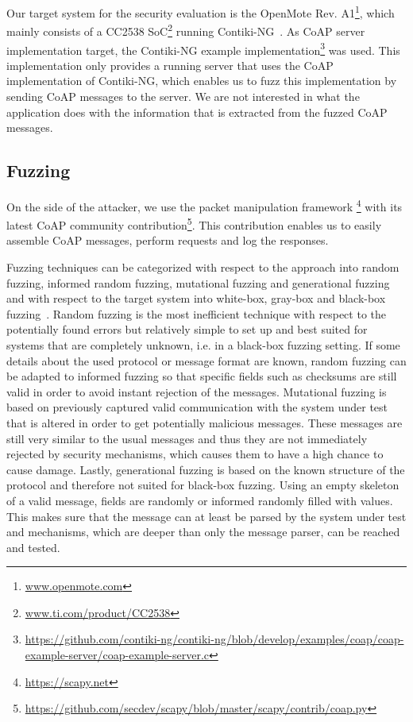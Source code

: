 Our target system for the security evaluation is the OpenMote Rev. A1\footnote{\url{www.openmote.com}}, which mainly consists of a CC2538 SoC\footnote{\url{www.ti.com/product/CC2538}} running Contiki-NG~\cite{contiki}. As CoAP server implementation target, the Contiki-NG example implementation\footnote{\url{https://github.com/contiki-ng/contiki-ng/blob/develop/examples/coap/coap-example-server/coap-example-server.c}} was used. This implementation only provides a running server that uses the CoAP implementation of Contiki-NG, which enables us to fuzz this implementation by sending CoAP messages to the server. We are not interested in what the application does with the information that is extracted from the fuzzed CoAP messages.

\subsection{Fuzzing}

On the side of the attacker, we use the \python packet manipulation framework \scapy\footnote{\url{https://scapy.net}} with its latest CoAP community contribution\footnote{\url{https://github.com/secdev/scapy/blob/master/scapy/contrib/coap.py}}. This contribution enables us to easily assemble CoAP messages, perform requests and log the responses.

Fuzzing techniques can be categorized with respect to the approach into random fuzzing, informed random fuzzing, mutational fuzzing and generational fuzzing and with respect to the target system into white-box, gray-box and black-box fuzzing~\cite{neystadtPenTesting}.
Random fuzzing is the most inefficient technique with respect to the potentially found errors but relatively simple to set up and best suited for systems that are completely unknown, i.e. in a black-box fuzzing setting. If some details about the used protocol or message format are known, random fuzzing can be adapted to informed fuzzing so that specific fields such as checksums are still valid in order to avoid instant rejection of the messages.
Mutational fuzzing is based on previously captured valid communication with the system under test that is altered in order to get potentially malicious messages. These messages are still very similar to the usual messages and thus they are not immediately rejected by security mechanisms, which causes them to have a high chance to cause damage.
Lastly, generational fuzzing is based on the known structure of the protocol and therefore not suited for black-box fuzzing. Using an empty skeleton of a valid message, fields are randomly or informed randomly filled with values. This makes sure that the message can at least be parsed by the system under test and mechanisms, which are deeper than only the message parser, can be reached and tested.
